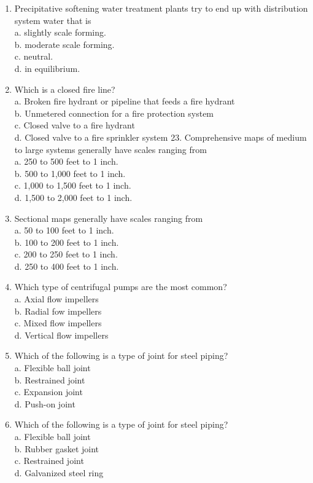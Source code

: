 \documentclass[10pt]{article}
\begin{document}
\begin{enumerate}
  \item Precipitative softening water treatment plants try to end up with distribution system water that is\\
a. slightly scale forming.\\
b. moderate scale forming.\\
c. neutral.\\
d. in equilibrium.

  \item Which is a closed fire line?\\
a. Broken fire hydrant or pipeline that feeds a fire hydrant\\
b. Unmetered connection for a fire protection system\\
c. Closed valve to a fire hydrant\\
d. Closed valve to a fire sprinkler system 23. Comprehensive maps of medium to large systems generally have scales ranging from\\
a. 250 to 500 feet to 1 inch.\\
b. 500 to 1,000 feet to 1 inch.\\
c. 1,000 to 1,500 feet to 1 inch.\\
d. 1,500 to 2,000 feet to 1 inch.

  \item Sectional maps generally have scales ranging from\\
a. 50 to 100 feet to 1 inch.\\
b. 100 to 200 feet to 1 inch.\\
c. 200 to 250 feet to 1 inch.\\
d. 250 to 400 feet to 1 inch.

  \item Which type of centrifugal pumps are the most common?\\
a. Axial flow impellers\\
b. Radial fow impellers\\
c. Mixed flow impellers\\
d. Vertical flow impellers

  \item Which of the following is a type of joint for steel piping?\\
a. Flexible ball joint\\
b. Restrained joint\\
c. Expansion joint\\
d. Push-on joint

  \item Which of the following is a type of joint for steel piping?\\
a. Flexible ball joint\\
b. Rubber gasket joint\\
c. Restrained joint\\
d. Galvanized steel ring


\end{enumerate}
\end{document}

